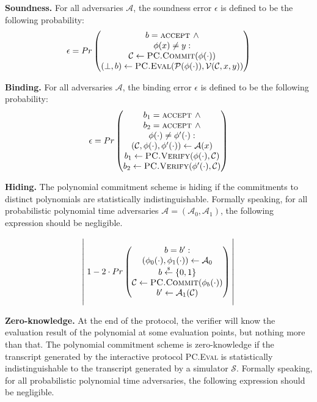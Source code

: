 \textbf{Soundness.} For all adversaries $\mathcal{A}$, the soundness error $\epsilon$ is defined to be the following probability:
$$
\epsilon = Pr
\begin{pmatrix}
 b = \textsc{accept } \wedge \\
 \phi(x) \neq y: \\
 \mathcal{C} \leftarrow \textsc{PC.Commit}(\phi(\cdot)) \\
 (\perp, b)\leftarrow \textsc{PC.Eval}(\mathcal{P}(\phi(\cdot)), \mathcal{V}(\mathcal{C}, x, y))
\end{pmatrix}
$$


\textbf{Binding.} For all adversaries $\mathcal{A}$, the binding error $\epsilon$ is defined to be the following probability:
$$
\epsilon = Pr
\begin{pmatrix}
 b_1 = \textsc{accept } \wedge \\
 b_2 = \textsc{accept } \wedge \\
 \phi(\cdot) \neq \phi^\prime(\cdot): \\
 (\mathcal{C}, \phi(\cdot), \phi^\prime(\cdot)) \leftarrow \mathcal{A}(x) \\
 b_1 \leftarrow \textsc{PC.Verify}(\phi(\cdot), \mathcal{C}) \\
 b_2 \leftarrow \textsc{PC.Verify}(\phi^\prime(\cdot), \mathcal{C})
\end{pmatrix}
$$



\textbf{Hiding.} The polynomial commitment scheme is hiding if the commitments to distinct polynomials are statistically indistinguishable. Formally speaking, for all probabilistic polynomial time adversaries $\mathcal{A} = (\mathcal{A}_0, \mathcal{A}_1)$, the following expression should be negligible.

$$
\left|\rule{0cm}{1.5cm}\right.
1 - 2 \cdot Pr
\begin{pmatrix}
 b = b^\prime : \\
 (\phi_0(\cdot), \phi_1(\cdot)) \leftarrow \mathcal{A}_0 \\
 b \overset{{\scriptscriptstyle\$}}{\leftarrow} \{0, 1\} \\
 \mathcal{C} \leftarrow \textsc{PC.Commit}(\phi_b(\cdot)) \\
 b^\prime \leftarrow \mathcal{A}_1(\mathcal{C})
\end{pmatrix}
\left|\rule{0cm}{1.5cm}\right.
$$


\textbf{Zero-knowledge.} At the end of the protocol, the verifier will know the evaluation result of the polynomial at some evaluation points, but nothing more than that. The polynomial commitment scheme is zero-knowledge if the transcript generated by the interactive protocol \textsc{PC.Eval} is statistically indistinguishable to the transcript generated by a simulator $\mathcal{S}$. Formally speaking, for all probabilistic polynomial time adversaries, the following expression should be negligible.

